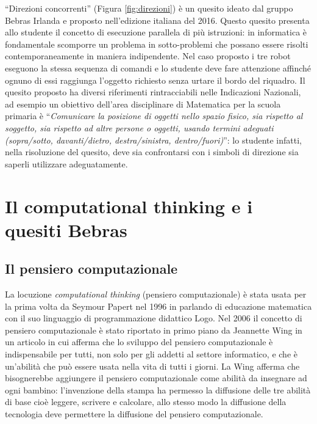 \documentclass[12pt]{report}
\begin{document}
``Direzioni concorrenti'' (Figura \ref{fig:direzioni}) è un quesito ideato dal gruppo Bebras Irlanda e proposto nell'edizione italiana del 2016. Questo quesito presenta allo studente il concetto di esecuzione parallela di più istruzioni: in informatica è fondamentale scomporre un problema in sotto-problemi che possano essere risolti contemporaneamente in maniera indipendente. Nel caso proposto i tre robot eseguono la stessa sequenza di comandi e lo studente deve fare attenzione affinché ognuno di essi raggiunga l'oggetto richiesto senza urtare il bordo del riquadro.
Il quesito proposto ha diversi riferimenti rintracciabili nelle Indicazioni Nazionali, ad esempio un obiettivo dell'area disciplinare di Matematica per la scuola primaria è ``\textit{Comunicare la posizione di oggetti nello spazio fisico, sia rispetto al soggetto, sia rispetto ad altre persone o oggetti, usando termini adeguati (sopra/sotto, davanti/dietro, destra/sinistra, dentro/fuori)}'': lo studente infatti, nella risoluzione del quesito, deve sia confrontarsi con i simboli di direzione sia saperli utilizzare adeguatamente. 


\chapter{Il computational thinking e i quesiti Bebras}
\label{cap3}
\section{Il pensiero computazionale}
La locuzione \textit{computational thinking} (pensiero computazionale) è stata usata per la prima volta da Seymour Papert nel 1996 in \cite{PapertCT} parlando di educazione matematica con il suo linguaggio di programmazione didattico Logo. 
Nel 2006 il concetto di pensiero computazionale è stato riportato in primo piano da Jeannette Wing in un articolo \cite{WingCT2006} in cui afferma che lo sviluppo del pensiero computazionale è indispensabile per tutti, non solo per gli addetti al settore informatico, e che è un'abilità che può essere usata nella vita di tutti i giorni. La Wing afferma che bisognerebbe aggiungere il pensiero computazionale come abilità da insegnare ad ogni bambino: l'invenzione della stampa ha permesso la diffusione delle tre abilità di base cioè leggere, scrivere e calcolare, allo stesso modo la diffusione della tecnologia deve permettere la diffusione del pensiero computazionale.
\end{document}
